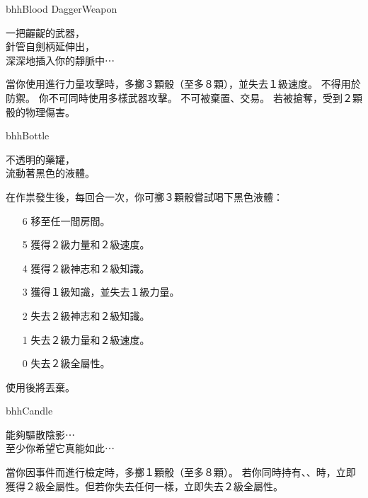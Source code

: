 \linebreak[0]%
\begin{ItemCard}{bhh}{Blood Dagger}{Weapon}
  \begin{CardStory}
    一把齷齪的武器，\\
    針管自劍柄延伸出，\\
    深深地插入你的靜脈中⋯
  \end{CardStory}
  當你使用\ThisName{}進行力量攻擊時，多擲３顆骰（至多８顆），並失去１級速度。\smallbreak
  \ThisName{}不得用於防禦。\smallbreak
  你不可同時使用多樣武器攻擊。\smallbreak
  \ThisName{}不可被棄置、交易。\smallbreak
  若\ThisName{}被搶奪，受到２顆骰的物理傷害。\smallbreak
\end{ItemCard}%
\linebreak[0]%
\begin{ItemCard}{bhh}{Bottle}{}
  \begin{CardStory}
    不透明的藥罐，\\
    流動著黑色的液體。
  \end{CardStory}
  在作祟發生後，每回合一次，你可擲３顆骰嘗試喝下黑色液體：
  \begin{itemize}
    \item[6] 移至任一間房間。
    \item[5] 獲得２級力量和２級速度。
    \item[4] 獲得２級神志和２級知識。
    \item[3] 獲得１級知識，並失去１級力量。
    \item[2] 失去２級神志和２級知識。
    \item[1] 失去２級力量和２級速度。
    \item[0] 失去２級全屬性。
  \end{itemize}
  使用後將\ThisName{}丟棄。\smallbreak
\end{ItemCard}%
\linebreak[0]%
\begin{ItemCard}{bhh}{Candle}{}
  \begin{CardStory}
    能夠驅散陰影⋯\\
    至少你希望它真能如此⋯
  \end{CardStory}
  當你因事件而進行檢定時，多擲１顆骰（至多８顆）。\smallbreak
  若你同時持有、、時，立即獲得２級全屬性。但若你失去任何一樣，立即失去２級全屬性。\smallbreak
\end{ItemCard}%
\linebreak[0]%

